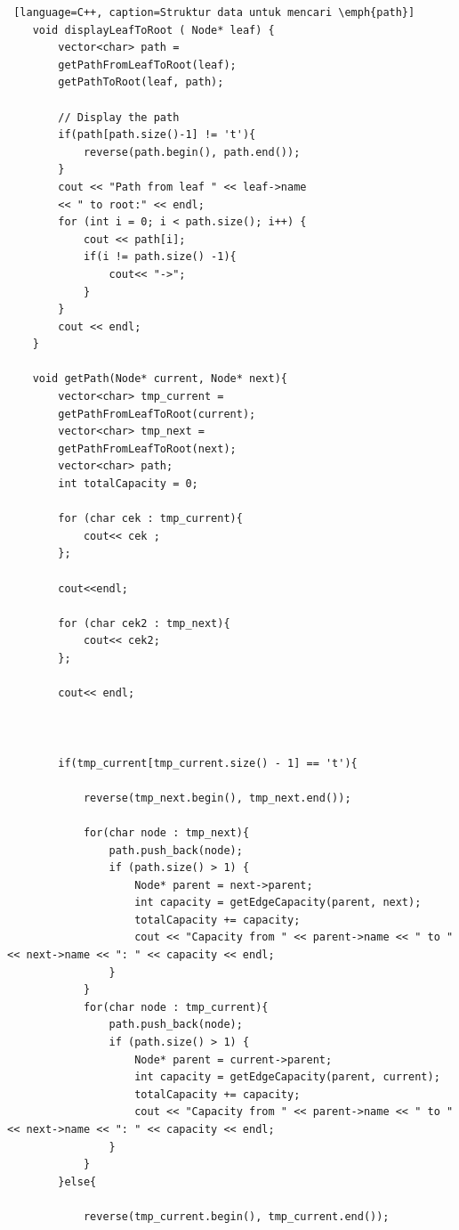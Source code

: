 \begin{lstlisting} [language=C++, caption=Struktur data untuk mencari \emph{path}]
    void displayLeafToRoot ( Node* leaf) {
        vector<char> path = 
        getPathFromLeafToRoot(leaf);
        getPathToRoot(leaf, path);

        // Display the path
        if(path[path.size()-1] != 't'){
            reverse(path.begin(), path.end());
        }
        cout << "Path from leaf " << leaf->name 
        << " to root:" << endl;
        for (int i = 0; i < path.size(); i++) {
            cout << path[i];
            if(i != path.size() -1){
                cout<< "->";
            }
        }
        cout << endl;
    }

    void getPath(Node* current, Node* next){
        vector<char> tmp_current = 
        getPathFromLeafToRoot(current);
        vector<char> tmp_next = 
        getPathFromLeafToRoot(next);
        vector<char> path;
        int totalCapacity = 0;

        for (char cek : tmp_current){
            cout<< cek ;
        };

        cout<<endl;

        for (char cek2 : tmp_next){
            cout<< cek2;
        };

        cout<< endl;



        if(tmp_current[tmp_current.size() - 1] == 't'){

            reverse(tmp_next.begin(), tmp_next.end());

            for(char node : tmp_next){
                path.push_back(node);
                if (path.size() > 1) {
                    Node* parent = next->parent;
                    int capacity = getEdgeCapacity(parent, next);
                    totalCapacity += capacity;
                    cout << "Capacity from " << parent->name << " to " << next->name << ": " << capacity << endl;
                }
            }
            for(char node : tmp_current){
                path.push_back(node);
                if (path.size() > 1) {
                    Node* parent = current->parent;
                    int capacity = getEdgeCapacity(parent, current);
                    totalCapacity += capacity;
                    cout << "Capacity from " << parent->name << " to " << next->name << ": " << capacity << endl;
                }
            }
        }else{
            
            reverse(tmp_current.begin(), tmp_current.end());


\end{lstlisting}

